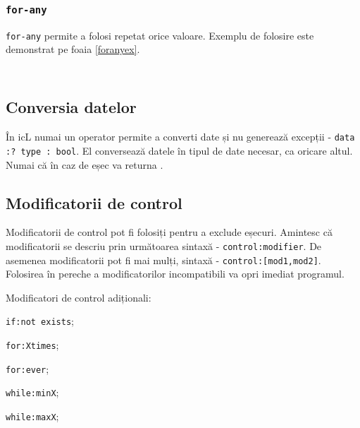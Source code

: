 \subsubsection{\texttt{for-any}}

\texttt{for-any} permite a folosi repetat orice valoare. Exemplu de folosire este demonstrat pe foaia \ref{foranyex}.

\begin{sourcecode}
\label{ifexistsex}
\inputminted[linenos]{icl}{../sources/ifexistsex.icL}
\end{sourcecode}

\begin{sourcecode}
\label{foranyex}
\inputminted[linenos]{icl}{../sources/foranyex.icL}
\end{sourcecode}


\subsection{Conversia datelor}

În icL numai un operator permite a converti date și nu generează excepții - \texttt{data :? type : bool}.
El conversează datele în tipul de date necesar, ca oricare altul. Numai că în caz de eșec va returna \void.

\subsection{Modificatorii de control}

Modificatorii de control pot fi folosiți pentru a exclude eșecuri.
Amintesc că modificatorii se descriu prin următoarea sintaxă - \texttt{control:modifier}. De asemenea modificatorii pot fi mai mulți, sintaxă - \texttt{control:[mod1,mod2]}. Folosirea în pereche a modificatorilor incompatibili va opri imediat programul.

Modificatori de control adiționali:
\begin{icItems}
	\item \texttt{if:not exists};
	\item \texttt{for:Xtimes};
	\item \texttt{for:ever};
	\item \texttt{while:minX};
	\item \texttt{while:maxX};
\end{icItems}

